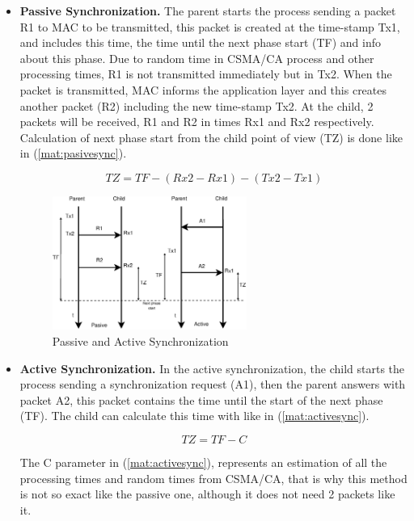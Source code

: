 \begin{itemize}
 \item \textbf{Passive Synchronization.} The parent starts the process sending a packet R1 to \ac{MAC} to be transmitted, this packet is
created at the time-stamp Tx1, and includes this time, the time until the next phase start (TF) and info about this phase. Due to random time in 
\ac{CSMA/CA} process and other processing times, R1 is not transmitted immediately but in Tx2. When the packet is transmitted, \ac{MAC} informs
the application layer and this creates another packet (R2) including the new time-stamp Tx2. At the child, 2 packets will be received, R1 and 
R2 in times Rx1 and Rx2 respectively. Calculation of next phase start from the child point of view (TZ) is done like in (\ref{mat:pasivesync}).

\begin{equation}
  TZ = TF - (Rx2 - Rx1) - (Tx2 - Tx1)
  \label{mat:pasivesync}
\end{equation}

\begin{figure}[here]
 \begin{center}
  \includegraphics[width=0.6\textwidth]{synchronization.eps}
 \end{center}
 \caption{Passive and Active Synchronization \cite{LPLandOLP}}
 \label{fig:synchronization}
\end{figure}
 
 \item \textbf{Active Synchronization.} In the active synchronization, the child starts the process sending a synchronization request (A1),
then the parent answers with packet A2, this packet contains the time until the start of the next phase (TF). The child can calculate this time
with like in (\ref{mat:activesync}).

\begin{equation}
  TZ = TF - C
 \label{mat:activesync}
\end{equation}

The C parameter in (\ref{mat:activesync}), represents an estimation of all the processing times and random times from \ac{CSMA/CA}, that is why
this method is not so exact like the passive one, although it does not need 2 packets like it.
\end{itemize}

